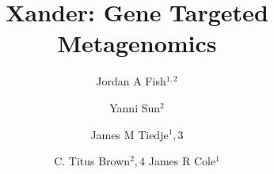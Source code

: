 \documentclass[10pt]{bmc_article}
\newenvironment{bmcformat}{\begin{raggedright}\baselineskip20pt\sloppy\setboolean{publ}{false}}{\end{raggedright}\baselineskip20pt\sloppy}
\begin{document}
\begin{bmcformat}



\title{Xander: Gene Targeted Metagenomics}
 


\author{Jordan A Fish\correspondingauthor$^{1,2}$%
      \and
         Yanni Sun$^2$%
       \and
         James M Tiedje$^1,3$%
       \and
         C. Titus Brown$^2,4$%
         James R Cole$^1$%
      }
      


\address{%
    \iid(1)Center for Microbial Ecology, Michigan State University
    \iid(2)Department of Computer Science and Engineer, Michigan State University
    \iid(3)Department of Plant, Soil and Microbial Sciences, Michigan State University
    \iid(4)Microbiology and Molecular Genetics, Michigan State University
}%

\maketitle




\end{bmcformat}
\end{document}
